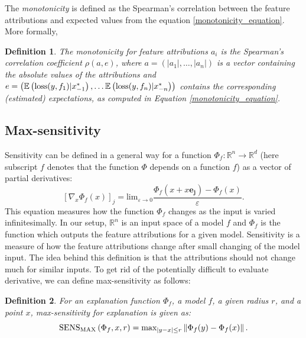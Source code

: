 \documentclass[magisterska,en]{pracamgr}
\newtheorem{defi}{Definition}[section]
\begin{document}
The \textit{monotonicity} is defined as the Spearman's correlation between the feature attributions and expected values from the equation \ref{monotonicity_equation}. More formally,

\begin{defi}
    The monotonicity for feature attributions $a_i$ is the Spearman’s correlation coefficient $\rho (a, e)$, where $a= \left(|a_1|, \ldots, |a_n|\right)$ is a vector containing the absolute values of the attributions and
    $e = \left(\mathbb{E}\left(\textup{loss}(y, f_1) | x_{-1}^*\right), \ldots \mathbb{E}\left(\textup{loss}(y, f_n) | x_{-n}^* \right) \right)$
contains the corresponding (estimated)
expectations, as computed in Equation \ref{monotonicity_equation}.
\end{defi}




\subsection{Max-sensitivity}
Sensitivity can be defined in a general way for a function $\Phi _f : \mathbb{R}^n \rightarrow \mathbb{R}^d$ (here subscript $f$ denotes that the function $\Phi$ depends on a function $f$) as a vector of partial derivatives:
\begin{equation}
    \left[ \nabla_{x} \Phi _{f}(x)\right]_j = \textrm{lim}_{\varepsilon \rightarrow 0}
    \frac{\Phi _{f} (x + x \textbf{e}_{\textbf{j}} ) - \Phi_{f}(x)}
    {\varepsilon}.
\end{equation}
This equation measures how the function $\Phi _f$ changes as the input is varied infinitesimally.
In our setup, $\mathbb{R}^n$ is an input space of a model $f$ and $\Phi _f$ is the function which outputs the feature attributions for a given model. Sensitivity is a measure of how the feature attributions change after small changing of the model input. The idea behind this definition is that the attributions should not change much for similar inputs. To get rid of the potentially difficult to evaluate derivative, we can define max-sensitivity as follows:
\begin{defi}
    For an explanation function $\Phi _f $, a model $f$,  a given radius $r$, and a point $x$, max-sensitivity for explanation is given as:
    \begin{equation}
        \textup{SENS}_{\textup{MAX}} \left(\Phi _f, x, r \right) = \textup{max} _{|y-x| \leq r} \left\| \Phi _f(y) - \Phi _f(x)\right\|.
    \end{equation}
\end{defi}
\end{document}
